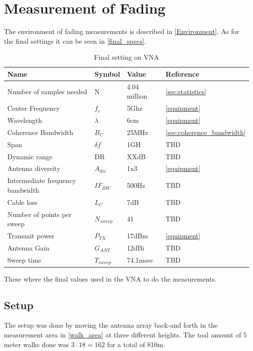 \chapter{Measurement of Fading}
The environment of fading measurements is described in \autoref{Environment}. As for the final settings it can be seen in \autoref{final_specs}.
\begin{table}[H]
\centering
\begin{tabular}{|l|l|l|l|}
\hline
\textbf{Name}					& \textbf{Symbol} & \textbf{Value} 	& \textbf{Reference} 		\\ \hline
Number of samples needed        & N           	& 4.04 million      & \autoref{sec:statistics}	\\ \hline
Center Frequency                & $f_c$       	& 5Ghz              & \autoref{equipment}		\\ \hline
Wavelength                      & $\lambda$   	& 6cm           	& \autoref{equipment}		\\ \hline
Coherence Bandwidth             & $B_C$		  	& 25MHz   			& \autoref{sec:coherence_bandwidth} \\ \hline
Span 							& $\delta f$ 	& 1GH 				& TBD \\ \hline
Dynamic range                   & DR          	& XXdB            	& TBD \\ \hline
Antenna diversity               & $A_{div}$   	& 1x3    			& \autoref{equipment} 		\\ \hline
Intermediate frequency bandwidth & $IF_{BW}$    & 500Hz   			& TBD \\ \hline
Cable loss 						& $L_{C}$     	& 7dB         		& TBD \\ \hline
Number of points per sweep 		& $N_{sweep}$ 	& 41				& TBD \\ \hline
Transmit power 					& $P_{TX}$ 		& 17dBm				& \autoref{equipment} 		\\ \hline
Antenna Gain 					& $G_{ANT}$ 	& 12dBi 			& TBD\\ \hline
Sweep time 						& $T_{sweep}$ 	& 74.1msec			& TBD \\ \hline
\end{tabular}
\caption{Final setting on VNA}
\label{final_specs}
\end{table}

These where the final values used in the VNA to do the measurements.

\section{Setup}
The setup was done by moving the antenna array back-and forth in the measurement area in \autoref{walk_area} at three different heights. The toal amount of 5 meter walks done was $3 \cdot 18 = 162$ for a total of 810m.




